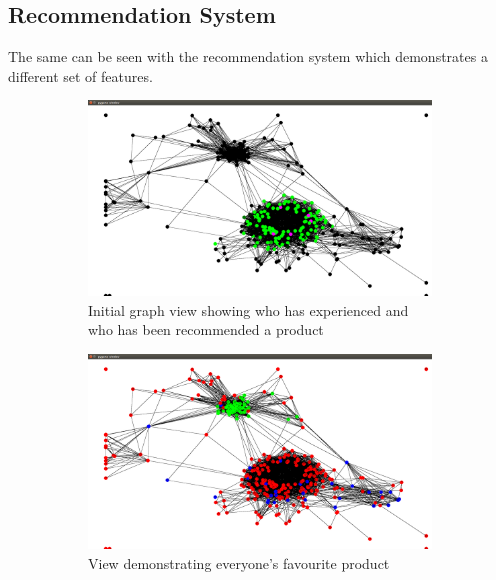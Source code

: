 \documentclass[12pt,a4paper]{article}
\begin{document}
\subsection{Recommendation System}

The same can be seen with the recommendation system which demonstrates a different set of features.

\begin{figure}[htb]
\centering
\captionsetup[subfigure]{justification=centering}
	\begin{subfigure}[b]{0.4\linewidth}
	\caption{Initial graph view showing who has experienced and who has been recommended a product}
	\label{fig:recommendationInitial}
	\includegraphics[scale=0.1]{Recommendation1.png}
	\end{subfigure}
\quad
	\begin{subfigure}[b]{0.4\linewidth}
	\caption{View demonstrating everyone's favourite product}
	\label{fig:recommendationFavourite}
	\includegraphics[scale=0.1]{Recommendation2.png}
	\end{subfigure}
\\	
	\begin{subfigure}[b]{0.4\linewidth}

\end{subfigure}
\end{figure}
\end{document}
